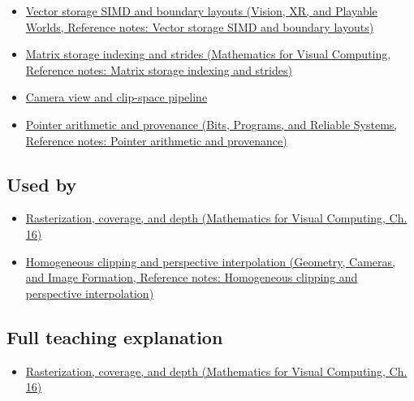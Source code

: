\begin{itemize}
\tightlist
\item
  \href{../07-Vision-XR-and-Playable-Worlds/main.pdf\#nameddest=appendix-26bf6bf2fb8b}{Vector storage SIMD and boundary layouts (Vision, XR, and Playable Worlds, Reference notes: Vector storage SIMD and boundary layouts)}
\item
  \href{../02-Mathematics-for-Visual-Computing/main.pdf\#nameddest=appendix-ffdc1d4e5350}{Matrix storage indexing and strides (Mathematics for Visual Computing, Reference notes: Matrix storage indexing and strides)}
\item
  \hyperref[appendix-1c07d64f5e70]{Camera view and clip-space pipeline}
\item
  \href{../01-Bits-Programs-and-Reliable-Systems/main.pdf\#nameddest=appendix-6af5921bc853}{Pointer arithmetic and provenance (Bits, Programs, and Reliable Systems, Reference notes: Pointer arithmetic and provenance)}
\end{itemize}

\subsection{Used by}\label{appendix-749ba51a6c25-used-by}

\hypertarget{appendix-749ba51a6c25-used-by}{}

\begin{itemize}
\tightlist
\item
  \href{../02-Mathematics-for-Visual-Computing/main.pdf\#nameddest=03-visual-computing-i-ch012-rasterization-coverage-and-depth}{Rasterization, coverage, and depth (Mathematics for Visual Computing, Ch. 16)}
\item
  \href{../03-Geometry-Cameras-and-Image-Formation/main.pdf\#nameddest=appendix-40426e4b2103}{Homogeneous clipping and perspective interpolation (Geometry, Cameras, and Image Formation, Reference notes: Homogeneous clipping and perspective interpolation)}
\end{itemize}

\subsection{Full teaching explanation}\label{appendix-749ba51a6c25-full-teaching-explanation}

\hypertarget{appendix-749ba51a6c25-full-teaching-explanation}{}

\begin{itemize}
\tightlist
\item
  \href{../02-Mathematics-for-Visual-Computing/main.pdf\#nameddest=03-visual-computing-i-ch012-rasterization-coverage-and-depth}{Rasterization, coverage, and depth (Mathematics for Visual Computing, Ch. 16)}
\end{itemize}

